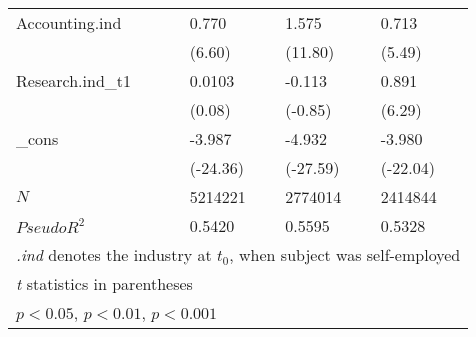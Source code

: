 \begin{longtable}{p{3 cm} p{2.25 cm} p{2.25 cm} p{2.25 cm}}
Accounting.ind &       0.770\sym{***}&       1.575\sym{***}&       0.713\sym{***}\\
            &      (6.60)         &     (11.80)         &      (5.49)         \\
Research.ind\_t1 &      0.0103         &      -0.113 &      0.891\sym{***}         \\
            &      (0.08)         &      (-0.85)        &      (6.29)        \\
\_cons      &      -3.987\sym{***}&      -4.932\sym{***}&      -3.980\sym{***}\\
            &    (-24.36)         &    (-27.59)         &    (-22.04)         \\
\hline
\(N\)       &     5214221         &     2774014         &     2414844         \\
\(Pseudo R^2\)       &   0.5420         &    0.5595       &    0.5328      \\
\hline\hline
\multicolumn{4}{l}{\footnotesize \textit{.ind} denotes the industry at $t_0$, when subject was self-employed}\\
\multicolumn{4}{l}{\footnotesize \textit{t} statistics in parentheses}\\
\multicolumn{4}{l}{\footnotesize \sym{*} \(p<0.05\), \sym{**} \(p<0.01\), \sym{***} \(p<0.001\)}\\
\end{longtable}
\bodyspacing